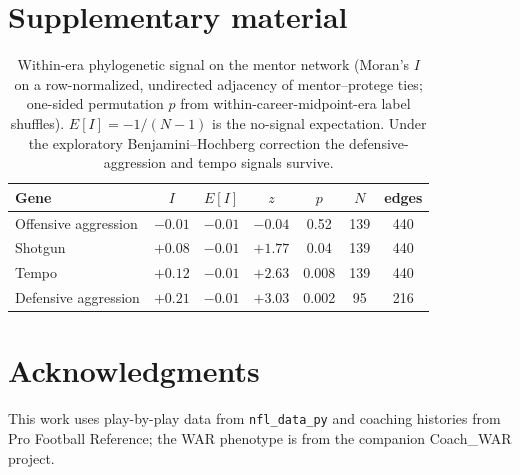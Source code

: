\documentclass[11pt]{article}
\begin{document}
\section*{Supplementary material}

\begin{table}[h]
\centering
\caption{Within-era phylogenetic signal on the mentor network (Moran's $I$ on a
row-normalized, undirected adjacency of mentor--protege ties; one-sided permutation
$p$ from within-career-midpoint-era label shuffles). $E[I]=-1/(N-1)$ is the
no-signal expectation. Under the exploratory Benjamini--Hochberg correction the
defensive-aggression and tempo signals survive.}
\label{tab:moran}
\begin{tabular}{lcccccc}
\toprule
Gene & $I$ & $E[I]$ & $z$ & $p$ & $N$ & edges \\
\midrule
Offensive aggression & $-0.01$ & $-0.01$ & $-0.04$ & 0.52 & 139 & 440 \\
Shotgun & $+0.08$ & $-0.01$ & $+1.77$ & 0.04 & 139 & 440 \\
Tempo & $+0.12$ & $-0.01$ & $+2.63$ & 0.008 & 139 & 440 \\
Defensive aggression & $+0.21$ & $-0.01$ & $+3.03$ & 0.002 & 95 & 216 \\
\bottomrule
\end{tabular}
\end{table}

\section*{Acknowledgments}
This work uses play-by-play data from \texttt{nfl\_data\_py} and coaching histories
from Pro Football Reference; the WAR phenotype is from the companion Coach\_WAR
project.
\end{document}
